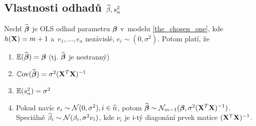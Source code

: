 \subsection{Vlastnosti odhadů $\widehat{\beta}, s_n^2$ }
\begin{theorem}
	Nechť $\widehat{\boldsymbol{\beta}}$ je OLS odhad parametru $\boldsymbol{\beta}$ v~modelu \eqref{the_chosen_one}, kde $h(\mathbf{X}) = m+1$ a~$e_1,\dots, e_n$ nezávislé, $e_i \sim (0,\sigma^2)$. Potom platí, že
	\begin{enumerate}
		\item $\mathbb{E}(\widehat{\boldsymbol{\beta}}) = \boldsymbol{\beta}$ (tj. $\widehat{\boldsymbol{\beta}}$ je nestranný)
		\item $\mathbb{C}\mathrm{ov}(\widehat{\boldsymbol{\beta}}) = \sigma^2 (\mathbf{X}^T \mathbf{X})^{-1}$
		\item $\mathbb{E}(s_n^2) = \sigma^2$
		\item Pokud navíc $e_i \sim \mathcal{N}(0,\sigma^2), i\in\widehat{n} $, potom $\widehat{\boldsymbol{\beta}} \sim \mathcal{N}_{m-1}(\boldsymbol{\beta}, \sigma^2(\mathbf{X}^T \mathbf{X})^{-1})$. Speciálně $\widehat{\beta}_i \sim \mathcal{N}(\beta_i, \sigma^2 \nu_i)$, kde $\nu_i$ je i-tý diagonání prvek matice $(\mathbf{X}^T \mathbf{X})^{-1}$.
	\end{enumerate}
\end{theorem}

